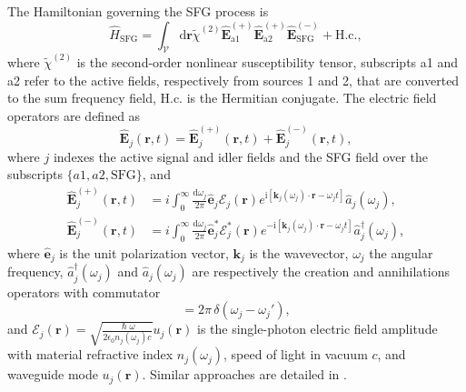 \documentclass[twocolumn,amssymb, nobibnotes, showpacs, aps, pra,10pt]{revtex4-1}
\newcommand*{\hc}{\textrm{H.c.}}
\newcommand*{\ii}{\mathrm{i}}
\begin{document}
The Hamiltonian governing the SFG process is
\begin{equation}
\hat{H}_{\text{SFG}}=\int_\mathcal{V}\text{d}\mathbf{r}\tilde{\chi}^{(2)}\hat{\mathbf{E}}_\text{a1}^{(+)}\hat{\mathbf{E}}_\text{a2}^{(+)}\hat{\mathbf{E}}^{(-)}_\text{SFG}+\hc,
\end{equation}
where $\tilde{\chi}^{(2)}$ is the second-order nonlinear susceptibility tensor, subscripts a1 and a2 refer to the active fields, respectively from sources 1 and 2, that are converted to the sum frequency field, $\hc$ is the Hermitian conjugate. The electric field operators are defined as
\begin{equation}
\hat{\mathbf{E}}_j(\mathbf{r},t) = \hat{\mathbf{E}}_j^{(+)}(\mathbf{r},t)+\hat{\mathbf{E}}_j^{(-)}(\mathbf{r},t),
\end{equation}
where $j$ indexes the active signal and idler fields and the SFG field over the subscripts $\{a1, a2, \text{SFG} \}$, and
\begin{align}
\hat{\mathbf{E}}_j^{(+)}(\mathbf{r},t)&=i\int_0^\infty  \frac{\text{d}\omega_j}{2 \pi} \hat{\mathbf{e}}_j\mathcal{E}_j (\mathbf{r}) e^{\ii [\mathbf{k}_j(\omega_j)\cdot \mathbf{r}- \omega_j t]} \hat{a}_j(\omega_j), \\
\hat{\mathbf{E}}_j^{(-)}(\mathbf{r},t)&=i\int_0^\infty  \frac{\text{d}\omega_j}{2 \pi} \hat{\mathbf{e}}_j^* \mathcal{E}_j^* (\mathbf{r}) e^{-\ii[\mathbf{k}_j(\omega_j)\cdot \mathbf{r}- \omega_j t]} \hat{a}_j^\dagger(\omega_j),
\end{align}
where $\hat{\mathbf{e}}_j$ is the unit polarization vector, $\mathbf{k}_j$ is the wavevector, $\omega_j$ the angular frequency, $\hat{a}_j^\dagger (\omega_j)$ and $\hat{a}_j (\omega_j)$ are respectively the creation and annihilations operators with commutator
\begin{equation}
[ \hat{a} (\omega_j) , \hat{a}^\dagger (\omega_j')] = 2 \pi \, \delta (\omega_j - \omega_j'),
\end{equation} 
and $\mathcal{E}_j (\mathbf{r}) =  \sqrt{\frac{\hslash \omega}{2 \epsilon_0 n_j (\omega_j) c}} u_j (\mathbf{r})$ is the single-photon electric field amplitude with material refractive index $n_j(\omega_j)$, speed of light in vacuum $c$, and waveguide mode $u_j(\mathbf{r})$. Similar approaches are detailed in \cite{Fiorentino2007,Milonni1995,Blow1990a}.
\end{document}
